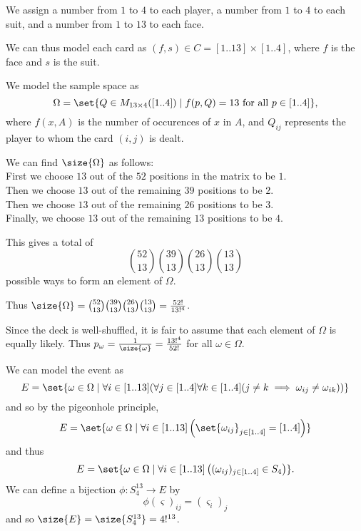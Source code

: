 \documentclass[12pt]{article}
\begin{document}
\begin{solution}
    We assign a number from $1$ to $4$ to each player,
    a number from $1$ to $4$ to each suit,
    and a number from $1$ to $13$ to each face.

    We can thus model each card as $(f, s) \in C = [1..13] \times [1..4]$, where
    $f$ is the face and $s$ is the suit.
    
    We model the sample space as \[
        \Omega = \set{
            Q \in M_{13 \times 4}([1..4]) \mid
            f(p, Q) = 13 \text{ for all } p \in [1..4]
        },
    \] where $f(x, A)$ is the number of occurences of $x$ in $A$, and
    $Q_{ij}$ represents the player to whom the card $(i, j)$ is dealt.

    We can find $\size{\Omega}$ as follows: \\
    First we choose $13$ out of the $52$ positions in the matrix to be $1$. \\
    Then we choose $13$ out of the remaining $39$ positions to be $2$. \\
    Then we choose $13$ out of the remaining $26$ positions to be $3$. \\
    Finally, we choose $13$ out of the remaining $13$ positions to be $4$.

    This gives a total of \[
        \binom{52}{13} \binom{39}{13} \binom{26}{13} \binom{13}{13}
    \] possible ways to form an element of $\Omega$.

    Thus $\size{\Omega} =
    \binom{52}{13} \binom{39}{13} \binom{26}{13} \binom{13}{13}
    = \frac{52!}{13!^{4}}$.

    Since the deck is well-shuffled, it is fair to assume that each element of
    $\Omega$ is equally likely.
    Thus $p_{\omega} = \frac{1}{\size{\omega}} = \frac{13!^{4}}{52!}$ for all
    $\omega \in \Omega$.

    We can model the event as \[
        E = \set{
            \omega \in \Omega \mid
            \forall i \in [1..13] (\forall j \in [1..4] \forall k \in [1..4] (
            j \neq k \implies \omega_{ij} \neq \omega_{ik}
            ))
        }
    \] and so by the pigeonhole principle, \[
        E = \set{
            \omega \in \Omega \mid
            \forall i \in [1..13]
            \left(\set{\omega_{ij}}_{j \in [1..4]} = [1..4]\right)
        }
    \] and thus \[
        E = \set{
            \omega \in \Omega \mid
            \forall i \in [1..13]
            \left((\omega_{ij})_{j \in [1..4]} \in S_{4}\right)
        }.
    \] We can define a bijection $\phi : S_{4}^{13} \to E$ by \[
        \phi(\varsigma)_{ij} = (\varsigma_{i})_{j}
    \] and so $\size{E} = \size{S_{4}^{13}} = 4!^{13}$.


\end{solution}
\end{document}
